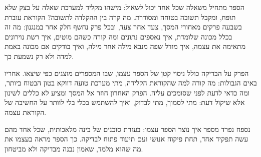 הספר מתחיל משאלה שכל אחד יכול לשאול: מישהו מקליד למערכת שאלה על בצק שלא תופח, ומקבל תשובה בטוחה ומסודרת. מה קרה בין ההקלדה לתשובה? הקוראת עוברת בשבעה פרקים מאחורי המסך, צעד אחר צעד, ובכל פרק נחשף חלק אחר במנגנון: מה זה בכלל מכונה שלומדת, איך נאספים נתונים ומה קורה כשהם מוטים, איך רשת נוירונים מתאימה את עצמה, איך מודל שפה מנבא מילה אחר מילה, ואיך בודקים אם מכונה באמת למדה ולא רק נשמעת כך.

הפרק על הבדיקה כולל ניסוי קטן של הספר עצמו, שבו המספרים מוצגים כפי שיצאו. אחריו באים הגבולות: מה קורה למה שהקוראת הקלידה, מתי מערכת טועה דווקא בטון הבטוח ביותר, ומה כדאי לדעת לפני שסומכים עליה. הפרק האחרון חוזר אל המסך ומציע לא כללים לשינון אלא שיקול דעת: מתי לסמוך, מתי לבדוק, ואיך להשתמש בכלי בלי לוותר על החשיבה של הקוראת עצמה.

נספח נפרד מספר איך נוצר הספר עצמו: בעזרת סוכנים של בינה מלאכותית, שכל אחד מהם עשה תפקיד אחד, תחת פיקוח אנושי ועם תיעוד פתוח לבדיקה. כך הספר מראה בעצמו את מה שהוא מלמד, שאמון נבנה מבדיקה ולא מביטחון.
